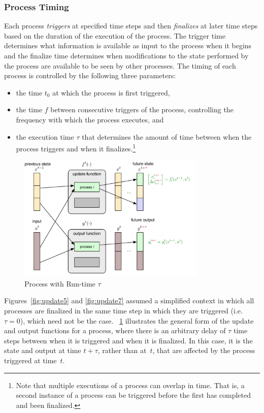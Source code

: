 \documentclass[12pt]{article}
\numberwithin{equation}{section}
\numberwithin{table}{section}
\numberwithin{figure}{section}
\begin{document}
\subsubsection{Process Timing}
\label{sec:timing}

Each process \emph{triggers} at specified time steps and then \emph{finalizes} at later time steps based on the duration of the execution of the process. The trigger time determines what information is available as input to the process when it begins and the finalize time determines when modifications to the state performed by the process are available to be seen by other processes.
The timing of each process is controlled by the following three parameters:
\begin{itemize}
\item the time $t_0$ at which the process is first triggered,
\item the time $f$ between consecutive triggers of the process, controlling the frequency with which the process executes, and
\item the execution time $\tau$ that determines the amount of time between when the process triggers and when it finalizes.\footnote{Note that multiple executions of a process can overlap in time. That is, a second instance of a process can be triggered before the first has completed and been finalized.}
\end{itemize}


\begin{figure}[hbtp]
  \centering
  \includegraphics[width=0.8\textwidth]{figures/simulator-update-diagram-delay}
  \caption{Process with Run-time $\tau$}
  \label{fig:updatetau}
\end{figure}

Figures~\ref{fig:update5} and \ref{fig:update7} assumed a simplified context in which all processes are finalized in the same time step in which they are triggered (i.e. $\tau = 0$), which need not be the case. \figurename~\ref{fig:updatetau} illustrates the general form of the update and output functions for a process, where there is an arbitrary delay of $\tau$ time steps between when it is triggered and when it is finalized. In this case, it is the state and output at time $t+\tau$, rather than at~$t$, that are affected by the process triggered at time~$t$.
\end{document}
